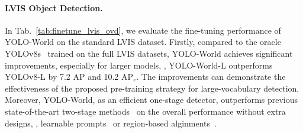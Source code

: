 \documentclass[10pt,twocolumn,letterpaper]{article}
\newcommand{\name}{YOLO-World}
\begin{document}
\paragraph{LVIS Object Detection.}
In Tab.~\ref{tab:finetune_lvis_ovd}, we evaluate the fine-tuning performance of \name{} on the standard LVIS dataset.
Firstly, compared to the oracle YOLOv8s~\cite{yolov8_ultralytics} trained on the full LVIS datasets, \name{} achieves significant improvements, especially for larger models, \eg, \name{}-L outperforms YOLOv8-L by 7.2 AP and 10.2 AP$_r$.
The improvements can demonstrate the effectiveness of the proposed pre-training strategy for large-vocabulary detection.
Moreover, \name{}, as an efficient one-stage detector, outperforms previous state-of-the-art two-stage methods~\cite{ViLD,Detic,FVLM,DetPro,BARON} on the overall performance without extra designs, \eg, learnable prompts~\cite{DetPro} or region-based alginments~\cite{ViLD}.
\end{document}
